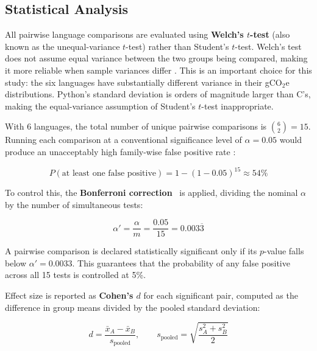 \subsection{Statistical Analysis}

All pairwise language comparisons are evaluated using \textbf{Welch's $t$-test} \cite{a967ba42-d0b9-3e65-976f-80cc6086b406} (also known as the unequal-variance $t$-test) rather than Student's $t$-test. Welch's test does not assume equal variance between the two groups being compared, making it more reliable when sample variances differ \cite{ruxton2006}. This is an important choice for this study: the six languages have substantially different variance in their gCO$_2$e distributions. Python's standard deviation is orders of magnitude larger than C's, making the equal-variance assumption of Student's $t$-test inappropriate.

With 6 languages, the total number of unique pairwise comparisons is $\binom{6}{2} = 15$. Running each comparison at a conventional significance level of $\alpha = 0.05$ would produce an unacceptably high family-wise false positive rate \cite{c3fa9fa7-dd2a-35f2-84a0-d5c07e68dd08}:
 
\begin{equation}
    P(\text{at least one false positive}) = 1 - (1 - 0.05)^{15} \approx 54\%
    \label{eq:fwer}
\end{equation}
 
To control this, the \textbf{Bonferroni correction}~\cite{c3fa9fa7-dd2a-35f2-84a0-d5c07e68dd08} is applied, dividing the nominal $\alpha$ by the number of simultaneous tests:
 
\begin{equation}
    \alpha' = \frac{\alpha}{m} = \frac{0.05}{15} = 0.003\overline{3}
    \label{eq:bonferroni}
\end{equation}
 
A pairwise comparison is declared statistically significant only if its $p$-value falls below $\alpha' = 0.0033$. This guarantees that the probability of any false positive across all 15 tests is controlled at 5\%.
 
Effect size is reported as \textbf{Cohen's $d$} \cite{cohen1988} for each significant pair, computed as the difference in group means divided by the pooled standard deviation:
 
\begin{equation}
    d = \frac{\bar{x}_A - \bar{x}_B}{s_{\text{pooled}}}, \qquad
    s_{\text{pooled}} = \sqrt{\frac{s_A^2 + s_B^2}{2}}
    \label{eq:cohend}
\end{equation}
 

